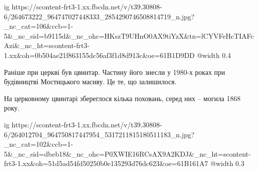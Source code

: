  
 
 
 
 

\ifcmt
  ig https://scontent-frt3-1.xx.fbcdn.net/v/t39.30808-6/264673222_964747027448333_2854290746508814719_n.jpg?_nc_cat=106&ccb=1-5&_nc_sid=b9115d&_nc_ohc=HKszT9UHnO0AX9tiYzX&tn=lCYVFeHcTIAFcAzi&_nc_ht=scontent-frt3-1.xx&oh=0b504ae21f863155dc56af3f1d8d913c&oe=61B1D9DD
  @width 0.4
\fi

Раніше при церкві був цвинтар. Частину його знесли у 1980-х роках при
будівництві Мостицького масиву. Це те, що залишилося.


На церковному цвинтарі збереглося кілька поховань, серед них – могила 1868
року.

\ifcmt
  ig https://scontent-frt3-1.xx.fbcdn.net/v/t39.30808-6/264012704_964750817447954_5317211815180511183_n.jpg?_nc_cat=102&ccb=1-5&_nc_sid=dbeb18&_nc_ohc=P0XWIE16RCsAX9A2KDJ&_nc_ht=scontent-frt3-1.xx&oh=51d5ad54fd50250b0e135293d76dc623&oe=61B161A7
  @width 0.3
\fi
